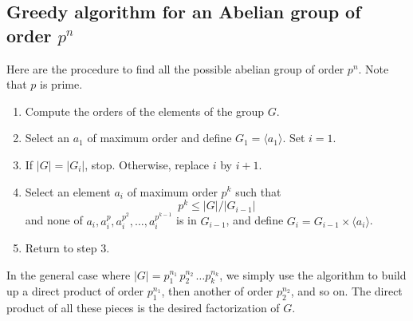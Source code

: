 \subsection{Greedy algorithm for an Abelian group of order $p^n$}

Here are the procedure to find all the possible abelian group of order $p^n$. Note that $p$ is prime.

\begin{enumerate}
    \item Compute the orders of the elements of the group $G$.
    \item Select an $a_1$ of maximum order and define $G_1 = \langle a_1 \rangle$. Set $i = 1$.
    \item If $|G| = |G_i|$, stop. Otherwise, replace $i$ by $i + 1$.
    \item Select an element $a_i$ of maximum order $p^k$ such that 
    \[
        p^k \leq |G|/|G_{i-1}|
    \]
    and none of $a_i, a_i^{p}, a_i^{p^2}, \ldots, a_i^{p^{k-1}}$ is in $G_{i-1}$, and define $G_i = G_{i-1} \times \langle a_i \rangle$.
    \item Return to step 3.
\end{enumerate}

In the general case where $|G| = p_1^{n_1}\, p_2^{n_2}\, \ldots p_k^{n_k}$, we simply use the algorithm to build 
up a direct product of order $p_1^{n_1}$, then another of order $p_2^{n_2}$, and so on.  The direct 
product of all these pieces is the desired factorization of $G$.

